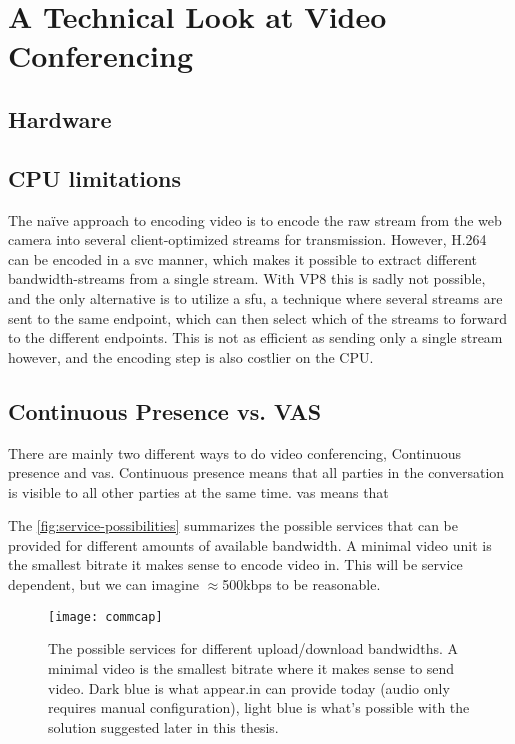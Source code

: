 \section{A Technical Look at Video Conferencing}

\subsection{Hardware}



\subsection{CPU limitations}

The naïve approach to encoding video is to encode the raw stream from the web camera into several client-optimized streams for transmission. However, H.264 can be encoded in a \gls{svc} manner, which makes it possible to extract different bandwidth-streams from a single stream. With VP8 this is sadly not possible, and the only alternative is to utilize a \gls{sfu}, a technique where several streams are sent to the same endpoint, which can then select which of the streams to forward to the different endpoints. This is not as efficient as sending only a single stream however, and the encoding step is also costlier on the CPU.


\subsection{Continuous Presence vs. VAS}

There are mainly two different ways to do video conferencing, Continuous presence and \gls{vas}. Continuous presence means that all parties in the conversation is visible to all other parties at the same time. \gls{vas} means that

The \autoref{fig:service-possibilities} summarizes the possible services that can be provided for different amounts of available bandwidth. A minimal video unit is the smallest bitrate it makes sense to encode video in. This will be service dependent, but we can imagine $\approx$500kbps to be reasonable.

\begin{figure}
    \centering
    \texttt{[image: commcap]}
    \caption{The possible services for different upload/download bandwidths. A minimal video is the smallest bitrate where it makes sense to send video. Dark blue is what appear.in can provide today (audio only requires manual configuration), light blue is what's possible with the solution suggested later in this thesis.}
    \label{fig:service-possibilities}
\end{figure}



